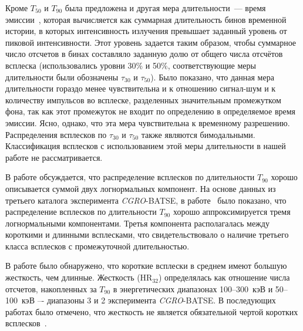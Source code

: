 Кроме $T_{50}$ и $T_{90}$ была предложена и другая мера длительности~--- время 
эмиссии~\citep{Mitrofanov_1999}, которая вычисляется как суммарная длительность 
бинов временной истории, в которых интенсивность излучения превышает заданный 
уровень от пиковой интенсивности. Этот уровень задается таким образом, чтобы 
суммарное число отсчетов в бинах составляло заданную долю от общего числа отсчётов 
всплеска (использовались уровни 30\% и 50\%, соответствующие меры длительности 
были обозначены $\tau_{30}$ и $\tau_{50}$). Было показано, что данная мера 
длительности гораздо менее чувствительна и к отношению сигнал-шум и к количеству 
импульсов во всплеске, разделенных значительным промежутком фона, так как этот 
промежуток не входит по определению в определяемое время эмиссии. Ясно, однако, 
что эта мера чувствительна к временному разрешению. Распределения всплесков 
по $\tau_{30}$ и $\tau_{50}$  также являются бимодальными. Классификация всплесков 
с использованием этой меры длительности в нашей работе не рассматривается. 

В работе \citep{McBreen_1994} обсуждается, что распределение всплесков по 
длительности $T_{90}$ хорошо описывается суммой двух логнормальных компонент. 
На основе данных из третьего каталога эксперимента \textit{CGRO}-BATSE, 
в работе~\citep{Horvath_2002} было показано, что распределение всплесков 
по длительности $T_{90}$ хорошо аппроксимируется тремя логнормальными компонентами. 
Третья компонента располагалась между короткими и длинными всплесками, 
что свидетельствовало о наличие третьего класса всплесков с промежуточной длительностью.

В работе \citep{Kouveliotou_1993}  было обнаружено, что короткие всплески в 
среднем имеют большую жесткость, чем длинные. Жесткость (HR$_{32}$) определялась 
как отношение числа отсчетов, накопленных за $T_{90}$ в энергетических 
диапазонах 100--300~кэВ и 50--100~кэВ –- диапазоны 3 и 2 эксперимента \textit{CGRO}-BATSE. 
В последующих работах было отмечено, что жесткость не является обязательной чертой 
коротких всплесков~\citep[см. например][]{Sakamoto_2006_proc, Norris_and_Bonnel_2006}. 

